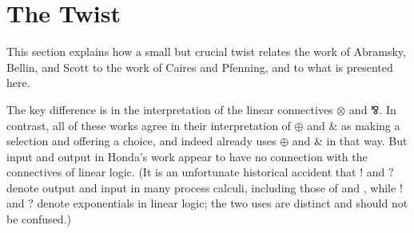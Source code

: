 \documentclass{jfp1}
\newcommand{\with}{\mathbin{\binampersand}}
\newcommand{\parr}{\mathbin{\bindnasrepma}}
\newcommand{\lolli}{\multimap}
\begin{document}


\section{The Twist}
\label{sec:twist}
This section explains how a small but crucial twist relates the work
of Abramsky, Bellin, and Scott to the work of Caires and Pfenning, and
to what is presented here.

The key difference is in the interpretation of the linear connectives
$\otimes$ and $\parr$.  In contrast, all of these works agree in their
interpretation of $\oplus$ and $\with$ as making a selection and
offering a choice, and indeed \citet{Honda93} already uses $\oplus$
and $\with$ in that way.  But input and output in Honda's work appear
to have no connection with the connectives of linear logic.  (It is an
unfortunate historical accident that $!$ and $?$ denote output and
input in many process calculi, including those of \citet{Honda93} and
\citet{GayVasconcelos10}, while $!$ and $?$ denote exponentials in
linear logic; the two uses are distinct and should not be confused.)
\end{document}
